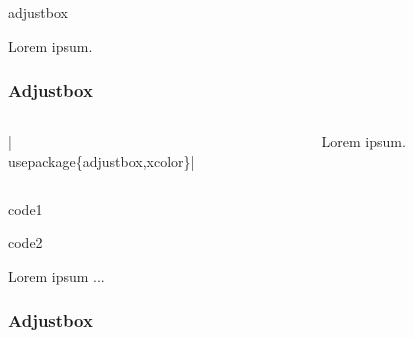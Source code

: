 \begin{saveblock}{adjustbox}
    \begin{highlightblock}[linewidth=0.6\textwidth,gobble=8]
        Lorem ipsum.

    \end{highlightblock}
\end{saveblock}

\begin{frame}
    \frametitle{Adjustbox}

    \begin{columns}
        \begin{column}{0.6\textwidth}
            \hll|\\usepackage\{adjustbox,xcolor\}|

        \end{column}
        \begin{column}{0.4\textwidth}
            Lorem ipsum.

        \end{column}
    \end{columns}
\end{frame}

\begin{saveblock}{code1}
    \begin{highlightblock}[linewidth=0.6\textwidth,gobble=8]
        \usepackage{environ}

    \end{highlightblock}
\end{saveblock}

\begin{saveblock}{code2}
    \begin{highlightblock}[linewidth=0.4\textwidth,gobble=8]
        \begin{important}
            Lorem ipsum ...
        \end{important}
    \end{highlightblock}
\end{saveblock}

\begin{frame}
    \frametitle{Adjustbox}

    \begin{columns}
        \begin{column}{0.6\textwidth}
        \end{column}
        \begin{column}{0.4\textwidth}
        \end{column}
    \end{columns}
\end{frame}
